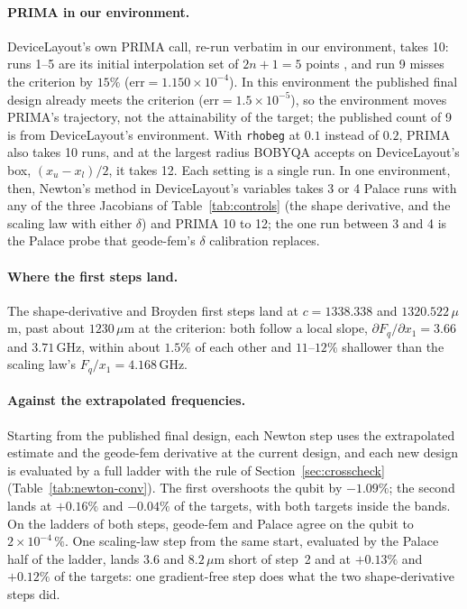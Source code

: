 \documentclass{anvil-paper}
\begin{document}
\paragraph{PRIMA in our environment.}
DeviceLayout's own PRIMA call,
re-run verbatim in our environment, takes 10: runs 1--5 are its initial
interpolation set of $2n+1 = 5$ points \citep{powell2009bobyqa}, and run 9
misses the criterion by $15\%$ ($\mathrm{err} = 1.150\times10^{-4}$). In
this environment the published final design already meets the criterion
($\mathrm{err} = 1.5\times10^{-5}$), so the environment moves PRIMA's
trajectory, not the attainability of the target; the published count of 9
is from DeviceLayout's environment. With \texttt{rhobeg}
at $0.1$ instead of $0.2$, PRIMA also takes 10 runs, and
at the largest radius BOBYQA accepts on DeviceLayout's box, $(x_u -
x_l)/2$, it takes 12. Each setting is a single run. In one environment, then,
Newton's method in DeviceLayout's variables takes 3 or 4 Palace runs with
any of the three Jacobians of Table~\ref{tab:controls} (the shape
derivative, and the scaling law with either $\delta$) and PRIMA 10 to 12;
the one run between 3 and 4 is the Palace probe that geode-fem's $\delta$
calibration replaces.

\paragraph{Where the first steps land.}
The shape-derivative and Broyden first steps land at $c = 1338.338$ and
$1320.522\,\mu$m, past about $1230\,\mu$m at the criterion: both follow
a local slope, $\partial F_q/\partial x_1 = 3.66$ and $3.71$\,GHz, within about $1.5\%$ of each other and $11$--$12\%$ shallower than the scaling law's $F_q/x_1 = 4.168$\,GHz.

\paragraph{Against the extrapolated frequencies.}
Starting from the published final design, each Newton step uses the
extrapolated estimate and the geode-fem derivative at the current design,
and each new design is evaluated by a full ladder with the rule of
Section~\ref{sec:crosscheck} (Table~\ref{tab:newton-conv}).
The first overshoots the qubit by $-1.09\%$; the second lands at $+0.16\%$
and $-0.04\%$ of the targets, with both targets inside the bands. On the
ladders of both steps, geode-fem and Palace agree on the qubit to
$2\times10^{-4}\,\%$.
One scaling-law step from the same start, evaluated by the Palace half of
the ladder, lands $3.6$ and $8.2\,\mu$m short of step~2 and at $+0.13\%$
and $+0.12\%$ of the targets: one gradient-free step does what the two
shape-derivative steps did.
\end{document}
